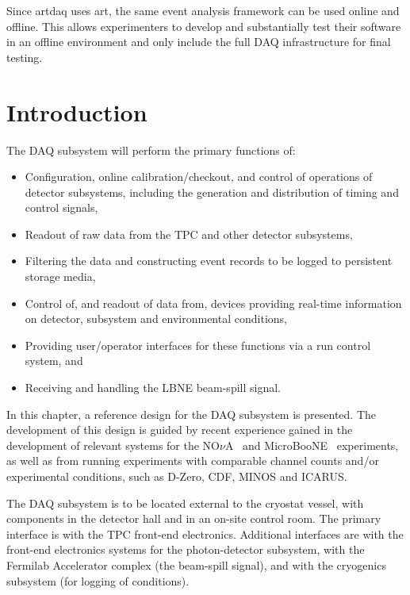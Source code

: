 Since artdaq uses art, the same event analysis framework can be used online and offline.  This allows experimenters to develop and substantially test their software in an offline environment and only include the full DAQ infrastructure for final testing.
\notestop


\section{Introduction}
The DAQ subsystem will perform the primary functions of:

\begin{itemize}
  \item Configuration, online calibration/checkout, and control of 
        operations of detector subsystems, including the generation 
        and distribution of timing and control signals,

  \item Readout of raw data from the TPC and other detector subsystems,  

  \item Filtering the data and constructing event records to be 
        logged to persistent storage media, 

  \item Control of, and readout of data from, devices 
        providing real-time information on detector, subsystem 
        and environmental conditions,  

  \item Providing user/operator interfaces for these functions via 
        a run control system, and

  \item Receiving and handling the LBNE beam-spill signal.
\end{itemize}

In this chapter, a reference design for the DAQ subsystem is presented.  
The development of this design is guided by recent experience gained 
in the development of relevant systems for the NO$\nu$A~\cite{novatdr} 
and MicroBooNE~\cite{microboonecdr} experiments, as well as from 
running experiments with comparable channel counts and/or experimental 
conditions, such as D-Zero, CDF, MINOS and ICARUS.


The DAQ subsystem is to be located external to the cryostat vessel, with 
components in the detector hall and in an on-site control room.  The 
primary interface is with the TPC front-end electronics.  Additional 
interfaces are with the front-end electronics systems for the 
photon-detector subsystem, with the Fermilab Accelerator complex 
(the beam-spill signal), and with the cryogenics subsystem (for logging of 
conditions).  

